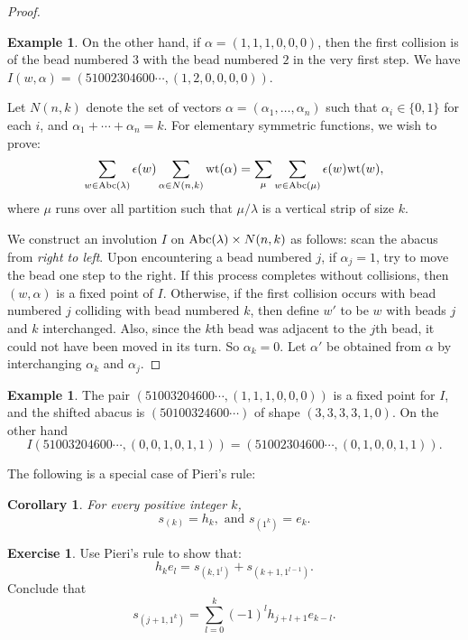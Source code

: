 \documentclass[11pt]{amsart}
\newtheorem{corollary}[theorem]{Corollary}
\theoremstyle{definition}
\theoremstyle{example}
\newtheorem{example}[theorem]{Example}
\newtheorem{exercise}[theorem]{Exercise}
\newcommand{\wt}{\textup{wt}}
\newcommand{\abc}{\textup{Abc}}
\begin{document}
\begin{proof}
\begin{example}
    On the other hand, if $\alpha=(1, 1, 1, 0, 0, 0)$, then the first collision is of the bead numbered $3$ with the bead numbered $2$ in the very first step.
    We have $I(w,\alpha) = (51002304600\dotsb, (1,2,0,0,0,0))$.
  \end{example}

  Let $N(n,k)$ denote the set of vectors $\alpha=(\alpha_1,\dotsc,\alpha_n)$ such that $\alpha_i\in \{0,1\}$ for each $i$, and $\alpha_1+\dotsb+\alpha_n=k$.
  For elementary symmetric functions, we wish to prove:
  \begin{displaymath}
    \sum_{w\in \abc(\lambda)} \epsilon(w)\sum_{\alpha\in N(n,k)} \wt(\alpha) = \sum_\mu \sum_{w\in \abc(\mu)} \epsilon(w) \wt(w),
  \end{displaymath}
  where $\mu$ runs over all partition such that $\mu/\lambda$ is a vertical strip of size $k$.
  
  We construct an involution $I$ on $\abc(\lambda)\times N(n,k)$ as follows: scan the abacus from \emph{right to left}.
  Upon encountering a bead numbered $j$, if $\alpha_j=1$, try to move the bead one step to the right.
  If this process completes without collisions, then $(w,\alpha)$ is a fixed point of $I$.
  Otherwise, if the first collision occurs with bead numbered $j$ colliding with bead numbered $k$, then define $w'$ to be $w$ with beads $j$ and $k$ interchanged.
  Also, since the $k$th bead was adjacent to the $j$th bead, it could not have been moved in its turn.
  So $\alpha_k=0$.
  Let $\alpha'$ be obtained from $\alpha$ by interchanging $\alpha_k$ and $\alpha_j$.
\end{proof}
  \begin{example}
  The pair $(51003204600\dotsb,(1,1,1,0,0,0))$ is a fixed point for $I$, and the shifted abacus is $(50100324600\dotsb)$ of shape $(3,3,3,3,1,0)$.
  On the other hand 
  \begin{displaymath}
    I(51003204600\dotsb,(0,0,1,0,1,1))=(51002304600\dotsb, (0,1,0,0,1,1)).
  \end{displaymath}
\end{example}
The following is a special case of Pieri's rule:
\begin{corollary}
  For every positive integer $k$,
  \begin{displaymath}
    s_{(k)} = h_k, \text{ and } s_{(1^k)} = e_k.
  \end{displaymath}
\end{corollary}
\begin{exercise}
  \label{exercise:hook-schur}
  Use Pieri's rule to show that:
  \begin{displaymath}
    h_ke_l = s_{(k, 1^l)} + s_{(k+1, 1^{l-1})}.
  \end{displaymath}
  Conclude that
  \begin{displaymath}
    s_{(j+1,1^k)} = \sum_{l=0}^k (-1)^l h_{j+l+1}e_{k-l}.
  \end{displaymath}
\end{exercise}
\end{document}
